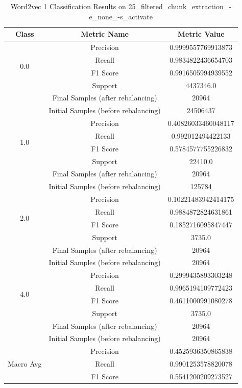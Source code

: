 \begin{longtable}{|c|c|c|}
\caption{Word2vec 1 Classification Results on 25\_filtered\_chunk\_extraction\_-e\_none\_-s\_activate} \label{tab:25_filtered_chunk_extraction_-e_none_-s_activate_word2vec_1_classifiers_results} \\
\hline
Class & Metric Name & Metric Value \\
\hline
\multirow{4}{*}{0.0} & Precision & 0.9999557769913873 \\
 & Recall & 0.9834822436654703 \\
 & F1 Score & 0.9916505994939552 \\
 & Support & 4437346.0 \\
 & Final Samples (after rebalancing) & 20964 \\
 & Initial Samples (before rebalancing) & 24506437 \\
\hline
\multirow{4}{*}{1.0} & Precision & 0.40826033460048117 \\
 & Recall & 0.992012494422133 \\
 & F1 Score & 0.5784577755226832 \\
 & Support & 22410.0 \\
 & Final Samples (after rebalancing) & 20964 \\
 & Initial Samples (before rebalancing) & 125784 \\
\hline
\multirow{4}{*}{2.0} & Precision & 0.10221483942414175 \\
 & Recall & 0.9884872824631861 \\
 & F1 Score & 0.1852716095847447 \\
 & Support & 3735.0 \\
 & Final Samples (after rebalancing) & 20964 \\
 & Initial Samples (before rebalancing) & 20964 \\
\hline
\multirow{4}{*}{4.0} & Precision & 0.2999435893303248 \\
 & Recall & 0.9965194109772423 \\
 & F1 Score & 0.4611000991080278 \\
 & Support & 3735.0 \\
 & Final Samples (after rebalancing) & 20964 \\
 & Initial Samples (before rebalancing) & 20964 \\
\hline
\multirow{4}{*}{Macro Avg} & Precision & 0.4525936350865838 \\
 & Recall & 0.9901253578820078 \\
 & F1 Score & 0.5541200209273527 \\

\end{longtable}

